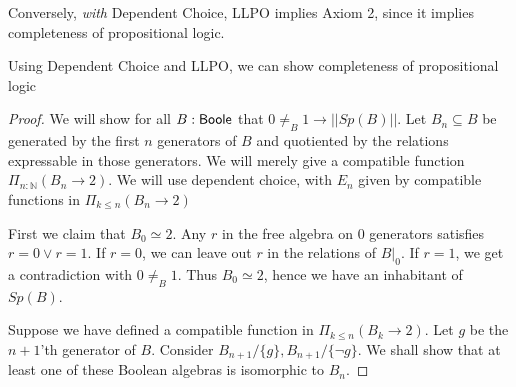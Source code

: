 Conversely, {\em with} Dependent Choice, LLPO implies Axiom 2, since it implies completeness of propositional logic.
\begin{lemma}
  Using Dependent Choice and LLPO, we can show completeness of propositional logic
\end{lemma}
\begin{proof}
%
%
%

  We will show for all $B:\mathsf{Boole}$ that $0\neq_B 1 \to ||Sp(B)||$.
  Let $B_n\subseteq B$ be generated by the first $n$ generators of $B$
  and quotiented by the relations expressable in those generators. 
  We will merely give a compatible function $\Pi_{n:\mathbb N} (B_n \to 2)$. 
  We will use dependent choice, with $E_n$ given by compatible functions in $\Pi_{k\leq n} (B_n \to 2)$

  First we claim that $B_0\simeq 2$. 
  Any $r$ in the free algebra on $0$ generators satisfies $r=0\vee r=1$. 
  If $r=0$, we can leave out $r$ in the relations of $B|_0$. If $r=1$, we get a contradiction with $0\neq_B 1$. 
  Thus $B_0 \simeq 2$, hence we have an inhabitant of $Sp(B)$.

  Suppose we have defined a compatible function in $\Pi_{k\leq n} (B_k\to 2)$.
  Let $g$ be the $n+1$'th generator of $B$.
  Consider $B_{n+1}/\{g\}, B_{n+1} / \{\neg g\}$. 
  We shall show that at least one of these Boolean algebras is isomorphic to $B_n$. 


\end{proof}
